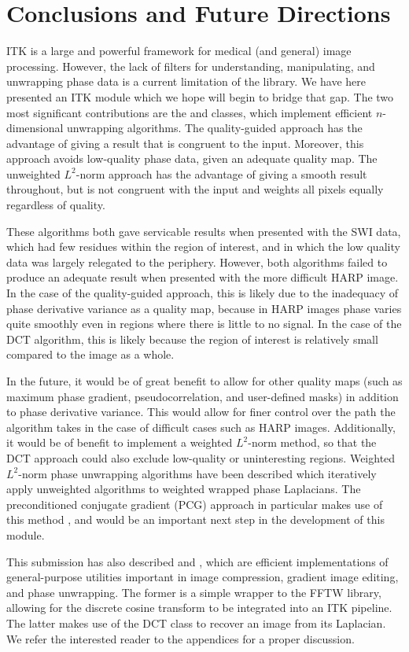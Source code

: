 \section{Conclusions and Future Directions}

ITK is a large and powerful framework for medical (and general) image processing.  However, the lack of filters for understanding, manipulating, and unwrapping phase data is a current limitation of the library.  We have here presented an ITK module which we hope will begin to bridge that gap.  The two most significant contributions are the  and  classes, which implement efficient $n$-dimensional unwrapping algorithms.  The quality-guided approach has the advantage of giving a result that is congruent to the input.  Moreover, this approach avoids low-quality phase data, given an adequate quality map.  The unweighted $L^2$-norm approach has the advantage of giving a smooth result throughout, but is not congruent with the input and weights all pixels equally regardless of quality.

These algorithms both gave servicable results when presented with the SWI data, which had few residues within the region of interest, and in which the low quality data was largely relegated to the periphery.  However, both algorithms failed to produce an adequate result when presented with the more difficult HARP image.  In the case of the quality-guided approach, this is likely due to the inadequacy of phase derivative variance as a quality map, because in HARP images phase varies quite smoothly even in regions where there is little to no signal.  In the case of the DCT algorithm, this is likely because the region of interest is relatively small compared to the image as a whole.

In the future, it would be of great benefit to allow for other quality maps (such as maximum phase gradient, pseudocorrelation, and user-defined masks) in addition to phase derivative variance.  This would allow for finer control over the path the algorithm takes in the case of difficult cases such as HARP images.  Additionally, it would be of benefit to implement a weighted $L^2$-norm method, so that the DCT approach could also exclude low-quality or uninteresting regions.  Weighted $L^2$-norm phase unwrapping algorithms have been described which iteratively apply unweighted algorithms to weighted wrapped phase Laplacians.  The preconditioned conjugate gradient (PCG) approach in particular makes use of this method \cite{Ghiglia1998}, and would be an important next step in the development of this module.

This submission has also described  and , which are efficient implementations of general-purpose utilities important in image compression, gradient image editing, and phase unwrapping.  The former is a simple wrapper to the FFTW library, allowing for the discrete cosine transform to be integrated into an ITK pipeline.  The latter makes use of the DCT class to recover an image from its Laplacian.  We refer the interested reader to the appendices for a proper discussion.